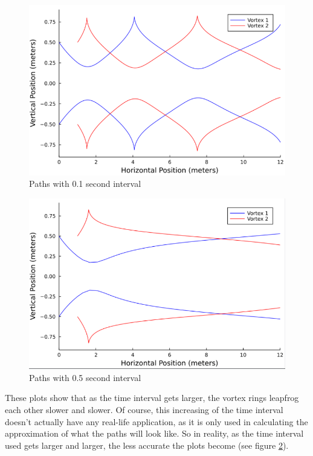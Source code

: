 \documentclass{article}
\begin{document}
\begin{figure}[ht]
\centering
\includegraphics[scale=0.75]{graphics/plots_1.1.4000.1.png}
\caption{Paths with 0.1 second interval}
\label{fig:paths_1_time}
\end{figure}

\begin{figure}[ht]
\centering
\includegraphics[scale=0.75]{graphics/plots_1.1.4000.5.png}
\caption{Paths with 0.5 second interval}
\label{fig:paths_5_time}
\end{figure}

These plots show that as the time interval gets larger, the vortex rings leapfrog each other slower and slower. Of course, this increasing of the time interval doesn't actually have any real-life application, as it is only used in calculating the approximation of what the paths will look like. So in reality, as the time interval used gets larger and larger, the less accurate the plots become (see figure \ref{fig:paths_5_time}).
\end{document}
